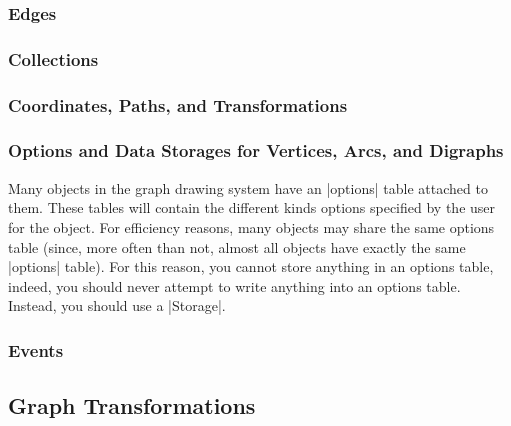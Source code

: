 

\subsubsection{Edges}



\subsubsection{Collections}



\subsubsection{Coordinates, Paths, and Transformations}



\subsubsection{Options and Data Storages for Vertices, Arcs, and Digraphs}

Many objects in the graph drawing system have an |options| table attached to
them. These tables will contain the different kinds options specified by the
user for the object. For efficiency reasons, many objects may share the same
options table (since, more often than not, almost all objects have exactly the
same |options| table). For this reason, you cannot store anything in an options
table, indeed, you should never attempt to write anything into an options
table. Instead, you should use a |Storage|.



\subsubsection{Events}



\subsection{Graph Transformations}
\label{section-gd-transformations}

